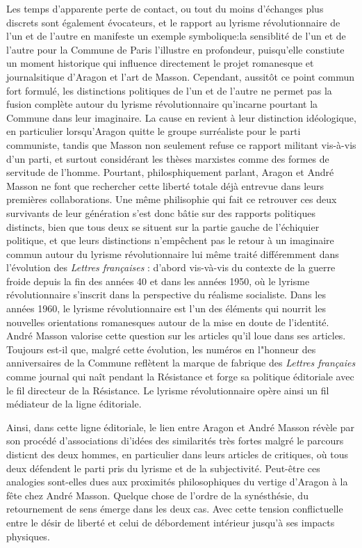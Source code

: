 Les temps d'apparente perte de contact, ou tout du moins d'échanges plus discrets sont également évocateurs, et le rapport au lyrisme révolutionnaire de l'un et de l'autre en manifeste un exemple symbolique:la sensiblité de l'un et de l'autre pour la Commune de Paris l'illustre en profondeur, puisqu'elle constiute un moment historique qui influence directement le projet romanesque et journalsitique d'Aragon et l'art de Masson. Cependant, aussitôt ce point commun fort formulé, les distinctions politiques de l'un et de l'autre ne permet pas la fusion complète autour du lyrisme révolutionnaire qu'incarne pourtant la Commune dans leur imaginaire. La cause en revient à leur distinction idéologique, en particulier lorsqu'Aragon quitte le groupe surréaliste pour le parti communiste, tandis que Masson non seulement refuse ce rapport militant vis-à-vis d'un parti, et surtout considérant les thèses marxistes comme des formes de servitude de l'homme. Pourtant, philosphiquement parlant, Aragon et André Masson ne font que rechercher cette liberté totale déjà entrevue dans leurs premières collaborations. Une même philisophie qui fait ce retrouver ces deux survivants de leur génération s'est donc bâtie sur des rapports politiques distincts, bien que tous deux se situent sur la partie gauche de l'échiquier politique, et que leurs distinctions n'empêchent pas le retour à un imaginaire commun autour du lyrisme révolutionnaire lui même traité différemment dans l'évolution des \emph{Lettres françaises} : d'abord vis-và-vis du contexte de la guerre froide depuis la fin des années 40 et dans les années 1950, où le lyrisme révolutionnaire s'inscrit dans la perspective du réalisme socialiste. Dans les années 1960, le lyrisme révolutionnaire est l'un des éléments qui nourrit les nouvelles orientations romanesques autour de la mise en doute de l'identité. André Masson valorise cette question sur les articles qu'il loue dans ses articles. Toujours est-il que, malgré cette évolution, les numéros en l"honneur des anniversaires de la Commune reflètent la marque de fabrique des \emph{Lettres françaies} comme journal qui naît pendant la Résistance et forge sa politique éditoriale avec le fil directeur de la Résistance. Le lyrisme révolutionnaire opère ainsi un fil médiateur de la ligne éditoriale.

Ainsi, dans cette ligne éditoriale, le lien entre Aragon et André Masson révèle par son procédé d'associations di'idées des similarités très fortes malgré le parcours disticnt des deux hommes, en particulier dans leurs articles de critiques, où tous deux défendent le parti pris du lyrisme et de la subjectivité. Peut-être ces analogies sont-elles dues aux proximités philosophiques du vertige d'Aragon à la fête chez André Masson. Quelque chose de l'ordre de la synésthésie, du retournement de sens émerge dans les deux cas. Avec cette tension conflictuelle entre le désir de liberté et celui de débordement intérieur jusqu'à ses impacts physiques. 


